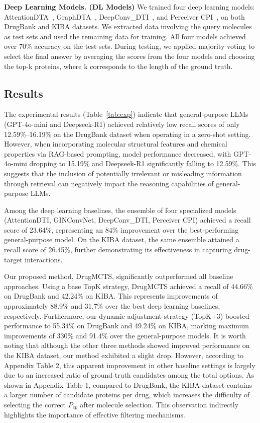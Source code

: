\documentclass[letterpaper,twocolumn,10pt]{llncs}
\begin{document}
\textbf{Deep Learning Models. (DL Models)}
We trained four deep learning models: AttentionDTA~\cite{zhao2019attentiondta}, GraphDTA~\cite{nguyen2021graphdta}, DeepConv\_DTI~\cite{lee2019deepconv}, and Perceiver CPI~\cite{nguyen2023perceiver}, on both DrugBank and KIBA datasets. We extracted data involving the query molecules as test sets and used the remaining data for training. All four models achieved over 70\% accuracy on the test sets. During testing, we applied majority voting to select the final answer by averaging the scores from the four models and choosing the top-k proteins, where k corresponds to the length of the ground truth.



\subsection{Results}
The experimental results (Table~\ref{tab:exp}) indicate that general-purpose LLMs (GPT-4o-mini and Deepseek-R1) achieved relatively low recall scores of only 12.59\%–16.19\% on the DrugBank dataset when operating in a zero-shot setting. However, when incorporating molecular structural features and chemical properties via RAG-based prompting, model performance decreased, with GPT-4o-mini dropping to 15.19\% and Deepseek-R1 significantly falling to 12.59\%. This suggests that the inclusion of potentially irrelevant or misleading information through retrieval can negatively impact the reasoning capabilities of general-purpose LLMs.

Among the deep learning baselines, the ensemble of four specialized models (AttentionDTI, GINConvNet, DeepConv\_DTI, Perceiver CPI) achieved a recall score of 23.64\%, representing an 84\% improvement over the best-performing general-purpose model. On the KIBA dataset, the same ensemble attained a recall score of 26.45\%, further demonstrating its effectiveness in capturing drug-target interactions.

Our proposed method, DrugMCTS, significantly outperformed all baseline approaches. Using a base TopK strategy, DrugMCTS achieved a recall of 44.66\% on DrugBank and 42.24\% on KIBA. This represents improvements of approximately 88.9\% and 31.7\% over the best deep learning baselines, respectively. Furthermore, our dynamic adjustment strategy (TopK+3) boosted performance to 55.34\% on DrugBank and 49.24\% on KIBA, marking maximum improvements of 330\% and 91.4\% over the general-purpose models.  It is worth noting that although the other three methods showed improved performance on the KIBA dataset, our method exhibited a slight drop. However, according to Appendix Table 2, this apparent improvement in other baseline settings is largely due to an increased ratio of ground truth candidates among the total options. As shown in Appendix Table 1, compared to DrugBank, the KIBA dataset contains a larger number of candidate proteins per drug, which increases the difficulty of selecting the correct $P_{cp}$ after molecule selection. This observation indirectly highlights the importance of effective filtering mechanisms.
\end{document}
